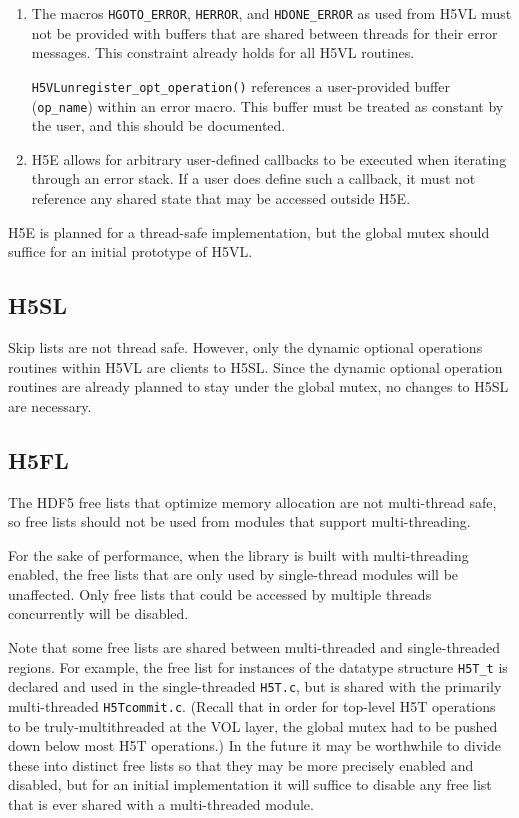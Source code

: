 \documentclass{article}
\begin{document}
\begin{enumerate}
    \item The macros \texttt{HGOTO\_ERROR}, \texttt{HERROR}, and  \texttt{HDONE\_ERROR} as used from H5VL must not be provided with buffers that are shared between threads for their error messages. This constraint already holds for all H5VL routines. 
    
    \texttt{H5VLunregister\_opt\_operation()} references a user-provided buffer (\texttt{op\_name}) within an error macro. This buffer must be treated as constant by the user, and this should be documented.

    \item H5E allows for arbitrary user-defined callbacks to be executed when iterating through an error stack. If a user does define such a callback, it must not reference any shared state that may be accessed outside H5E. 
\end{enumerate}

H5E is planned for a thread-safe implementation, but the global mutex should suffice for an initial prototype of H5VL.

\subsection{H5SL}

Skip lists are not thread safe. However, only the dynamic optional operations routines within H5VL are clients to H5SL. Since the dynamic optional operation routines are already planned to stay under the global mutex, no changes to H5SL are necessary. 

\subsection{H5FL}

The HDF5 free lists that optimize memory allocation are not multi-thread safe, so free lists should not be used from modules that support multi-threading.

For the sake of performance, when the library is built with multi-threading enabled, the free lists that are only used by single-thread modules will be unaffected. Only free lists that could be accessed by multiple threads concurrently will be disabled.

Note that some free lists are shared between multi-threaded and single-threaded regions. For example, the free list for instances of the datatype structure \texttt{H5T\_t} is declared and used in the single-threaded \texttt{H5T.c}, but is shared with the primarily multi-threaded \texttt{H5Tcommit.c}. (Recall that in order for top-level H5T operations to be truly-multithreaded at the VOL layer, the global mutex had to be pushed down below most H5T operations.) In the future it may be worthwhile to divide these into distinct free lists so that they may be more precisely enabled and disabled, but for an initial implementation it will suffice to disable any free list that is ever shared with a multi-threaded module.
\end{document}
